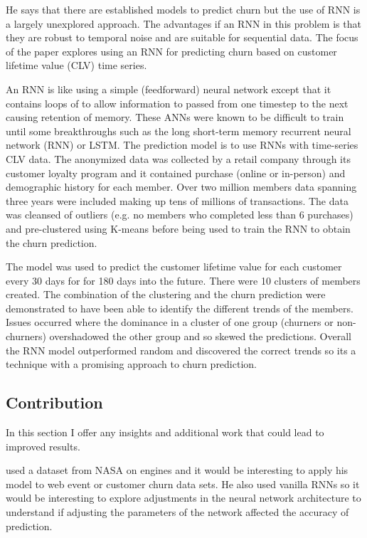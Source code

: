 \documentclass[final,a4paper,peerreviewca]{IEEEtran}
\begin{document}
He says that there are established models to predict churn but the use of RNN is a largely unexplored approach. The advantages if an RNN in this problem is that they are robust to temporal noise and are suitable for sequential data. The focus of the paper explores using an RNN for predicting churn based on customer lifetime value (CLV) time series. 

An RNN is like using a simple (feedforward) neural network except that it contains loops of to allow information to passed from one timestep to the next causing retention of memory. These ANNs were known to be difficult to train until some breakthroughs such as the long short-term memory recurrent neural network (RNN) or LSTM. The prediction model is to use RNNs with time-series CLV data. The anonymized data was collected by a retail company through its customer loyalty program and it contained purchase (online or in-person) and demographic history for each member. Over two million members data spanning three years were included making up tens of millions of transactions. The data was cleansed of outliers (e.g. no members who completed less than 6 purchases) and pre-clustered using K-means before being used to train the RNN to obtain the churn prediction.

The model was used to predict the customer lifetime value for each customer every 30 days for for 180 days into the future. There were 10 clusters of members created. The combination of the clustering and the churn prediction were demonstrated to have been able to identify the different trends of the members. Issues occurred where the dominance in a cluster of one group (churners or non-churners) overshadowed the other group and so skewed the predictions. Overall the RNN model outperformed random and discovered the correct trends so its a technique with a promising approach to churn prediction.

\subsection{Contribution}
In this section I offer any insights and additional work that could lead to improved results.

\cite{Martinsson:2016} used a dataset from NASA on engines and it would be interesting to apply his model to web event or customer churn data sets. He also used vanilla RNNs so it would be interesting to explore adjustments in the neural network architecture to understand if adjusting the parameters of the network affected the accuracy of prediction.
\end{document}
